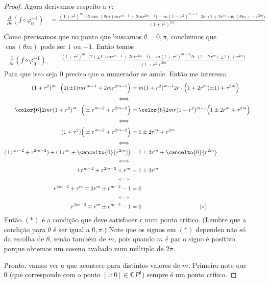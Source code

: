 \begin{proof}
Agora derivamos respeito a \(r\):
\begin{align*}
\frac{\partial }{\partial r}(f \circ \varphi_0^{-1})&=\frac{(1+r^2)^m\cdot \Big(2\cos (\theta m)m r^{m-1}+2mr^{2m-1}\Big)-m(1+r^2)^{m-1}\cdot 2r\cdot \Big(1+2r^m \cos (\theta m)+r^{2m}\Big)}{(1+r^2)^{2m}}\\
\end{align*}
Como precisamos que no ponto que buscamos \(\theta =0,\pi\), concluimos que \(\cos (\theta m)\) pode ser \(1\) ou \(-1\). Então temos
\begin{align*}
\frac{\partial }{\partial r}(f \circ \varphi_0^{-1})&=\frac{(1+r^2)^m\cdot \Big(2(\pm 1)m r^{m-1}+2mr^{2m-1}\Big)-m(1+r^2)^{m-1}2r\cdot \Big(1+2r^m (\pm 1)+r^{2m}\Big)}{(1+r^2)^{2m}}
\end{align*}
Para que isso seja \(0\) preciso que o numerador se anule. Então me interessa
\begin{align*}
(1+r^2)^m\cdot \Big(2(\pm 1)m r^{m-1}+2mr^{2m-1}\Big)&=m(1+r^2)^{m-1}2r\cdot \Big(1+2r^m (\pm 1)+r^{2m}\Big)\\
\iff\\
{\color{6}2mr}(1+r^2)^m\cdot \Big(\pm r^{m-2}+r^{2m-2}\Big)&={\color{6}2mr}(1+r^2)^{m-1}\Big(1\pm 2r^m+r^{2m}\Big)\\
\iff\\
(1+r^2)\Big(\pm r^{m-2}+r^{2m-2}\Big)&=1\pm 2r^m+r^{2m}\\
\iff\\
(\pm r^{m-2}+r^{2m-2})+(\pm r^{m}+\cancelto{0}{r^{2m})}&=1\pm 2r^m+\cancelto{0}{r^{2m}}\\\iff\\
\pm r^{m-2}+r^{2m-2}\pm r^{m}&=1\pm 2r^m\\
\iff \\
r^{2m-2}\pm r^m \mp 2r^m \pm r^{m-2}-1&=0 \\
\iff\\
r^{2m-2}\mp r^m \pm r^{m-2}-1&=0 \qquad \qquad\qquad \qquad \qquad   (*)
\end{align*}
Então \((*)\) é a condição que deve satisfacer \(r\) num ponto crítico. (Lembre que a condição para \(\theta\) é ser igual a \(0,\pi\).) Note que os signos em \((*)\) dependen não só da escolha de \(\theta\), senão também de \(m\), pois quando \(m\) é par o signo é positivo porque obtemos um coseno avaliado num múltiplo de \(2\pi\).

Pronto, vamos ver o que acontece para distintos valores de \(m\). Primeiro note que  \(0\) (que corresponde com o ponto  \([1:0] \in \mathbb{C}P^1\)) sempre é um ponto crítico.


\end{proof}
